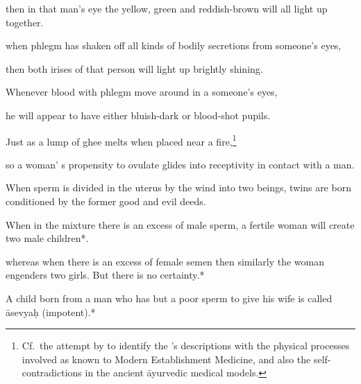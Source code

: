\begin{translation}
\begin{tt}
\item[36d]

then in that man’s eye the yellow, green and reddish-brown will all light 
  up together. 
  
\item[36e]

when phlegm has shaken off all kinds of bodily secretions from 
  someone’s eyes,
  
\item[36f]

then both irises of that person will light up brightly shining. 
  
\item[36g]

Whenever blood with phlegm move around in a someone’s eyes,
  
\item[36h]

he will appear to have either bluish-dark or blood-shot pupils. 
  
\item[36i]

Just as a lump of ghee melts when placed near a fire,\footnote{Cf.\ the attempt 
by \citet[222--241]{das-2003} to identify the \SS's descriptions with the physical 
processes involved as known to Modern Establishment Medicine, and also the 
self-contradictions in the ancient āyurvedic medical models.}
  
\item[36j]

so a woman’ s propensity to ovulate glides into receptivity in contact 
  with a man.  
  
\item[37]

When sperm is divided in the uterus by the wind into two beings, twins 
  are born conditioned by the former good and evil deeds.  
  
\item[37.1]

When in the mixture there is an excess of male sperm, a fertile woman 
  will create two male children*.
  
\item[37.2]

whereas when there is an excess of female semen then similarly the 
  woman engenders two girls. But there is no certainty.*
  
\item[37.3]

 A child born from a man who has but a poor sperm to give his wife is 
  called āsevyaḥ (impotent).*
  

\end{tt}
\end{translation}
